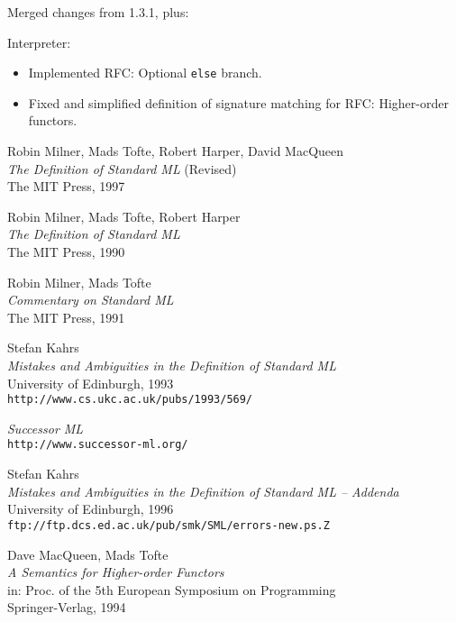 \documentclass[twoside,titlepage]{article}
\begin{document}
\begin{appendix}
Merged changes from 1.3.1, plus:

Interpreter:
\begin{itemize} \setlength{\itemsep}{0em}
\item Implemented RFC: Optional {\tt else} branch.
\item Fixed and simplified definition of signature matching for RFC: Higher-order functors.
\end{itemize}


\vfill
\pagebreak
\begin{thebibliography}{MTHM97}

Robin Milner, Mads Tofte, Robert Harper, David MacQueen \\
{\it The Definition of Standard ML} (Revised) \\
The MIT Press, 1997

Robin Milner, Mads Tofte, Robert Harper \\
{\it The Definition of Standard ML} \\
The MIT Press, 1990

Robin Milner, Mads Tofte \\
{\it Commentary on Standard ML} \\
The MIT Press, 1991

Stefan Kahrs \\
{\it Mistakes and Ambiguities in the Definition of Standard ML} \\
University of Edinburgh, 1993 \\
{\small\tt{http://www.cs.ukc.ac.uk/pubs/1993/569/}}

{\it Successor ML} \\
{\small\tt{http://www.successor-ml.org/}}

Stefan Kahrs \\
{\it Mistakes and Ambiguities in the Definition of Standard ML -- Addenda} \\
University of Edinburgh, 1996 \\
{\small\tt{ftp://ftp.dcs.ed.ac.uk/pub/smk/SML/errors-new.ps.Z}}

Dave MacQueen, Mads Tofte \\
{\it A Semantics for Higher-order Functors} \\
in: Proc. of the 5th European Symposium on Programming \\
Springer-Verlag, 1994


\end{thebibliography}
\end{appendix}
\end{document}
